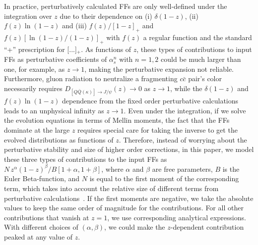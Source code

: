 \documentclass[Physsubmission, Phys]{SciPost}
\begin{document}
In practice, perturbatively calculated FFs are only well-defined under the integration over $z$ due to their dependence on (i) $\delta(1-z)$, (ii) $f(z)\ln(1-z)$ and (iii) $f(z)/[1-z]_+$ and $f(z)[\ln(1-z)/(1-z)]_+$ with $f(z)$ a regular function and the standard ``+'' prescription for [...]$_+$. As functions of $z$, these types of contributions to input FFs as perturbative coefficients of $\alpha_s^n$ with $n=1,2$ could be much larger than one, for example, as $z\to 1$, making the perturbative expansion not reliable.  Furthermore, gluon radiation to neutralize a fragmenting $c\bar{c}$ pair's color necessarily requires $D_{[Q\bar{Q}(\kappa)]\to J/\psi}(z) \to 0$ as $z\to 1$, while the $\delta(1-z)$ and $f(z)\ln(1-z)$ dependence from the fixed order perturbative calculations leads to an unphysical infinity as $z\to 1$.  Even under the integration, if we solve the evolution equations in terms of Mellin moments, the fact that the FFs dominate at the large $z$ requires special care for taking the inverse to get the evolved distributions as functions of $z$. 
Therefore, instead of worrying about the perturbative stability and size of higher order corrections, in this paper, we model these three types of contributions to the input FFs as 
$N\, z^\alpha (1-z)^\beta/B[1+\alpha,1+\beta]$, 
where $\alpha$ and $\beta$ are free parameters, $B$ is the Euler Beta-function, and $N$ is equal to the first moment of the corresponding term, which takes into account the relative size of different terms from perturbative calculations~\cite{Ma:2013yla,Ma:2014eja}.
If the first moments are negative, we take the absolute values to keep the same order of magnitude for the contributions.
For all other contributions that vanish at $z=1$, we use corresponding analytical expressions.  
With different choices of $(\alpha,\beta)$, we could make the $z$-dependent contribution peaked at any value of $z$.  
\end{document}

